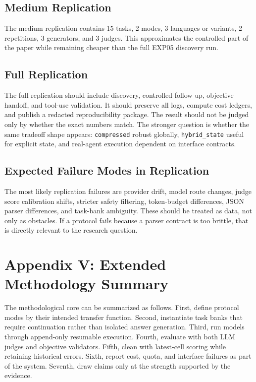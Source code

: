 \documentclass[11pt]{article}
\begin{document}
\subsection{Medium Replication}
The medium replication contains 15 tasks, 2 modes, 3 languages or variants, 2 repetitions, 3 generators, and 3 judges. This approximates the controlled part of the paper while remaining cheaper than the full EXP05 discovery run.

\subsection{Full Replication}
The full replication should include discovery, controlled follow-up, objective handoff, and tool-use validation. It should preserve all logs, compute cost ledgers, and publish a redacted reproducibility package. The result should not be judged only by whether the exact numbers match. The stronger question is whether the same tradeoff shape appears: \texttt{compressed} robust globally, \texttt{hybrid\_state} useful for explicit state, and real-agent execution dependent on interface contracts.

\subsection{Expected Failure Modes in Replication}
The most likely replication failures are provider drift, model route changes, judge score calibration shifts, stricter safety filtering, token-budget differences, JSON parser differences, and task-bank ambiguity. These should be treated as data, not only as obstacles. If a protocol fails because a parser contract is too brittle, that is directly relevant to the research question.

\clearpage
\section{Appendix V: Extended Methodology Summary}
The methodological core can be summarized as follows. First, define protocol modes by their intended transfer function. Second, instantiate task banks that require continuation rather than isolated answer generation. Third, run models through append-only resumable execution. Fourth, evaluate with both LLM judges and objective validators. Fifth, clean with latest-cell scoring while retaining historical errors. Sixth, report cost, quota, and interface failures as part of the system. Seventh, draw claims only at the strength supported by the evidence.
\end{document}
